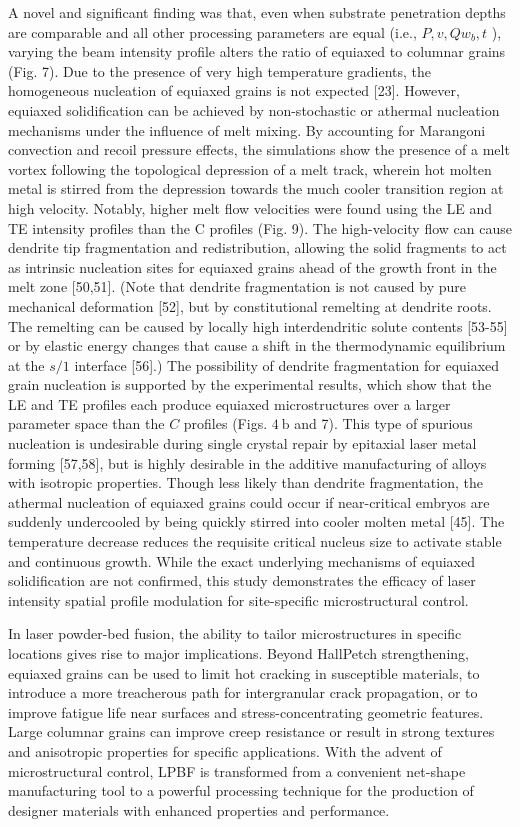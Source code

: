 \documentclass[10pt]{article}
\begin{document}
A novel and significant finding was that, even when substrate penetration depths are comparable and all other processing parameters are equal (i.e., $P, v, Q w_{b}, t$ ), varying the beam intensity profile alters the ratio of equiaxed to columnar grains (Fig. 7). Due to the presence of very high temperature gradients, the homogeneous nucleation of equiaxed grains is not expected [23]. However, equiaxed solidification can be achieved by non-stochastic or athermal nucleation mechanisms under the influence of melt mixing. By accounting for Marangoni convection and recoil pressure effects, the simulations show the presence of a melt vortex following the topological depression of a melt track, wherein hot molten metal is stirred from the depression towards the much cooler transition region at high velocity. Notably, higher melt flow velocities were found using the LE and TE intensity profiles than the C profiles (Fig. 9). The high-velocity flow can cause dendrite tip fragmentation and redistribution, allowing the solid fragments to act as intrinsic nucleation sites for equiaxed grains ahead of the growth front in the melt zone [50,51]. (Note that dendrite fragmentation is not caused by pure mechanical deformation [52], but by constitutional remelting at dendrite roots. The remelting can be caused by locally high interdendritic solute contents [53-55] or by elastic energy changes that cause a shift in the thermodynamic equilibrium at the $s / 1$ interface [56].) The possibility of dendrite fragmentation for equiaxed grain nucleation is supported by the experimental results, which show that the LE and TE profiles each produce equiaxed microstructures over a larger parameter space than the $C$ profiles (Figs. $4 \mathrm{~b}$ and 7). This type of spurious nucleation is undesirable during single crystal repair by epitaxial laser metal forming [57,58], but is highly desirable in the additive manufacturing of alloys with isotropic properties. Though less likely than dendrite fragmentation, the athermal nucleation of equiaxed grains could occur if near-critical embryos are suddenly undercooled by being quickly stirred into cooler molten metal [45]. The temperature decrease reduces the requisite critical nucleus size to activate stable and continuous growth. While the exact underlying mechanisms of equiaxed solidification are not confirmed, this study demonstrates the efficacy of laser intensity spatial profile modulation for site-specific microstructural control.

In laser powder-bed fusion, the ability to tailor microstructures in specific locations gives rise to major implications. Beyond HallPetch strengthening, equiaxed grains can be used to limit hot cracking in susceptible materials, to introduce a more treacherous path for intergranular crack propagation, or to improve fatigue life near surfaces and stress-concentrating geometric features. Large columnar grains can improve creep resistance or result in strong textures and anisotropic properties for specific applications. With the advent of microstructural control, LPBF is transformed from a convenient net-shape manufacturing tool to a powerful processing technique for the production of designer materials with enhanced properties and performance.
\end{document}
